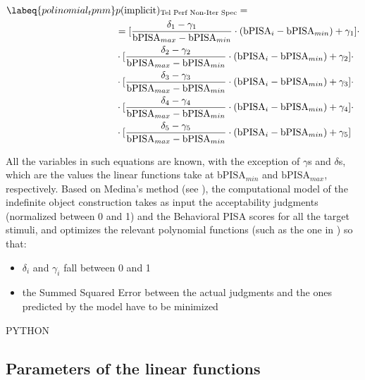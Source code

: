 \begin{align}  \labeq{polinomial_tpnm}
    & p(\text{implicit})\textsubscript{Tel Perf Non-Iter Spec} = \nonumber \\ & = [\frac{\delta_1 - \gamma_1}{\textrm{bPISA}_{max} - \textrm{bPISA}_{min}} \cdot ({\textrm{bPISA}_{i} - \textrm{bPISA}_{min}}) + \gamma_1] \cdot \nonumber \\ & \cdot [\frac{\delta_2 - \gamma_2}{\textrm{bPISA}_{max} - \textrm{bPISA}_{min}} \cdot ({\textrm{bPISA}_{i} - \textrm{bPISA}_{min}}) + \gamma_2] \cdot \nonumber \\ & \cdot [\frac{\delta_3 - \gamma_3}{\textrm{bPISA}_{max} - \textrm{bPISA}_{min}} \cdot ({\textrm{bPISA}_{i} - \textrm{bPISA}_{min}}) + \gamma_3] \cdot \nonumber \\ & \cdot [\frac{\delta_4 - \gamma_4}{\textrm{bPISA}_{max} - \textrm{bPISA}_{min}} \cdot ({\textrm{bPISA}_{i} - \textrm{bPISA}_{min}}) + \gamma_4] \cdot \nonumber \\ & \cdot [\frac{\delta_5 - \gamma_5}{\textrm{bPISA}_{max} - \textrm{bPISA}_{min}} \cdot ({\textrm{bPISA}_{i} - \textrm{bPISA}_{min}}) + \gamma_5]
\end{align}

All the variables in such equations are known, with the exception of $\gamma$s and $\delta$s, which are the values the linear functions take at $\textrm{bPISA}_{min}$ and $\textrm{bPISA}_{max}$, respectively. Based on Medina's method (see ), the computational model of the indefinite object construction takes as input the acceptability judgments (normalized between 0 and 1) and the Behavioral PISA scores for all the target stimuli, and optimizes the relevant polynomial functions (such as the one in ) so that:

\begin{itemize}
    \item $\delta_i$ and $\gamma_i$ fall between 0 and 1
    \item the Summed Squared Error between the actual judgments and the ones predicted by the model have to be minimized
\end{itemize}

PYTHON



\subsection{Parameters of the linear functions} 

